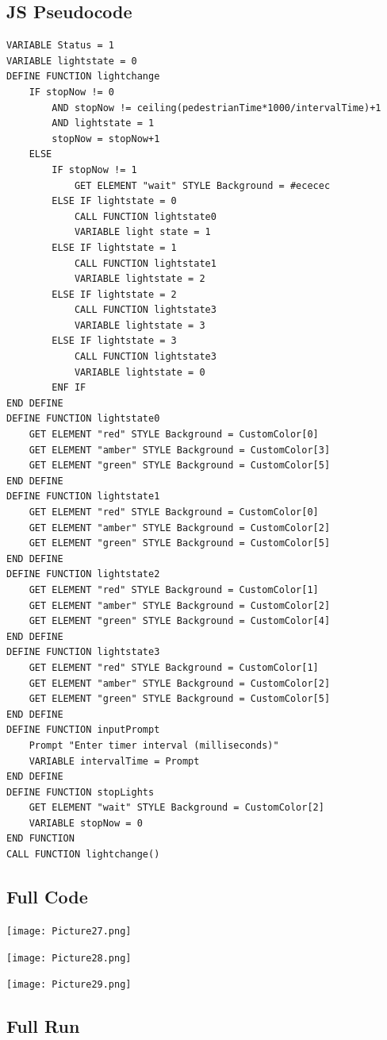 \documentclass[a4paper]{article}
\begin{document}
\subsection{JS Pseudocode}
\begin{lstlisting}
VARIABLE Status = 1
VARIABLE lightstate = 0
DEFINE FUNCTION lightchange
	IF stopNow != 0 
		AND stopNow != ceiling(pedestrianTime*1000/intervalTime)+1 
		AND lightstate = 1
		stopNow = stopNow+1
	ELSE
		IF stopNow != 1
			GET ELEMENT "wait" STYLE Background = #ececec
		ELSE IF lightstate = 0
			CALL FUNCTION lightstate0
			VARIABLE light state = 1
		ELSE IF lightstate = 1
			CALL FUNCTION lightstate1
			VARIABLE lightstate = 2
		ELSE IF lightstate = 2
			CALL FUNCTION lightstate3
			VARIABLE lightstate = 3
		ELSE IF lightstate = 3
			CALL FUNCTION lightstate3
			VARIABLE lightstate = 0
		ENF IF
END DEFINE
DEFINE FUNCTION lightstate0
	GET ELEMENT "red" STYLE Background = CustomColor[0]
	GET ELEMENT "amber" STYLE Background = CustomColor[3]
	GET ELEMENT "green" STYLE Background = CustomColor[5]
END DEFINE
DEFINE FUNCTION lightstate1
	GET ELEMENT "red" STYLE Background = CustomColor[0]
	GET ELEMENT "amber" STYLE Background = CustomColor[2]
	GET ELEMENT "green" STYLE Background = CustomColor[5]
END DEFINE
DEFINE FUNCTION lightstate2
	GET ELEMENT "red" STYLE Background = CustomColor[1]
	GET ELEMENT "amber" STYLE Background = CustomColor[2]
	GET ELEMENT "green" STYLE Background = CustomColor[4]
END DEFINE
DEFINE FUNCTION lightstate3
	GET ELEMENT "red" STYLE Background = CustomColor[1]
	GET ELEMENT "amber" STYLE Background = CustomColor[2]
	GET ELEMENT "green" STYLE Background = CustomColor[5]
END DEFINE
DEFINE FUNCTION inputPrompt
	Prompt "Enter timer interval (milliseconds)"
	VARIABLE intervalTime = Prompt
END DEFINE
DEFINE FUNCTION stopLights
	GET ELEMENT "wait" STYLE Background = CustomColor[2]
	VARIABLE stopNow = 0
END FUNCTION
CALL FUNCTION lightchange()
\end{lstlisting}
\subsection{Full Code}
\noindent\texttt{[image: Picture27.png]} \par
\noindent\texttt{[image: Picture28.png]} \par
\noindent\texttt{[image: Picture29.png]} \par \newpage
\subsection{Full Run}
\newpage
\end{document}
